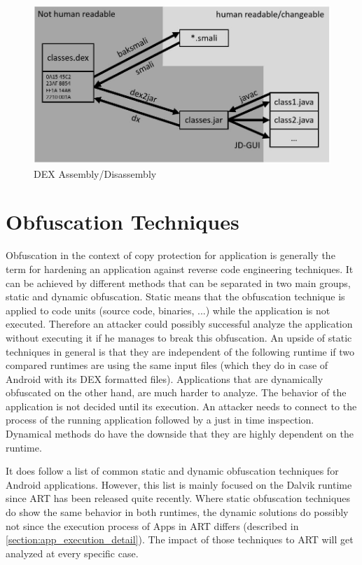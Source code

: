 \begin{figure}[htb]
  \includegraphics[width=\textwidth]{figures/dex_disassembly}
  \caption[DEX Assembly/Disassembly]{DEX Assembly/Disassembly}
  \label{fig:dex_disassembly}
\end{figure}


\section{Obfuscation Techniques}\label{section:obfuscation_techniques}
Obfuscation in the context of copy protection for application
is generally the term for hardening an application against
reverse code engineering techniques. It can be achieved by different methods
that can be separated in two main groups, static and dynamic obfuscation.
Static means that the obfuscation technique is applied to code units (source
code, binaries, ...) while the application is not executed. Therefore an
attacker could possibly successful analyze the application without executing it
if he manages to break this obfuscation. An upside of static techniques in general is that they are independent of the following runtime if two compared runtimes are using the same input files (which they do in case of Android with
its DEX formatted files).
Applications that are dynamically obfuscated on the other hand, are much harder to analyze. The behavior
of the application is not decided until its execution. An attacker needs to connect to the process of the running application followed by a just in time inspection. Dynamical methods do have the downside that they are highly dependent on the runtime.

It does follow a list of common static and dynamic obfuscation techniques
for Android applications. However, this list is mainly focused on
the Dalvik runtime since ART has been released quite recently.
Where static obfuscation techniques do show the same behavior in both
runtimes, the dynamic solutions do possibly not since the execution process
of Apps in ART differs (described in \autoref{section:app_execution_detail}).
The impact of those techniques to ART will get analyzed at every specific case.


